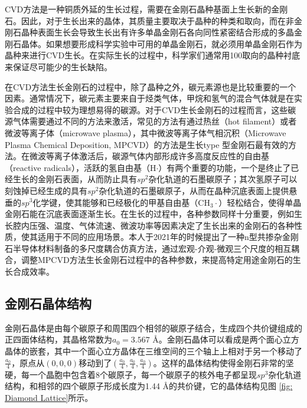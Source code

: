 \documentclass[type = bachelor]{whu-thesis}
\begin{document}
CVD方法是一种铜质外延的生长过程，需要在金刚石晶种基面上生长新的金刚石\cite{isberg2002high,isberg2002high}。因此，对于生长出来的晶体，其质量主要取决于晶种的种类和取向，而在非金刚石晶种表面生长会导致生长出有许多单晶金刚石各向同性紧密结合形成的多晶金刚石晶体\cite{mildren2013optical, jahnke2012long}。如果想要形成科学实验中可用的单晶金刚石，就必须用单晶金刚石作为晶种来进行CVD生长。在实际生长的过程中，科学家们通常用{100}取向的晶种衬底来保证尽可能少的生长缺陷\cite{gicquel2001cvd}。

在CVD方法生长金刚石的过程中，除了晶种之外，碳元素源也是比较重要的一个因素。通常情况下，碳元素主要来自于烃类气体，甲烷和氢气的混合气体就是在实验合成的过程中较为理想易得的碳源。对于CVD生长金刚石的过程而言，这些碳源气体需要通过不同的方法来激活，常见的方法有通过热丝（hot filament）或者微波等离子体（microwave plasma），其中微波等离子体气相沉积（Microwave Plasma Chemical Deposition, MPCVD）的方法是生长type \uppercase\expandafter{}型金刚石最有效的方法\cite{robins1990line, nemanich2014cvd}。在微波等离子体激活后，碳源气体内部形成许多高度反应性的自由基（reactive radicals），活跃的氢自由基（H$\cdot$）有两个重要的功能，一个是终止了已经生长的金刚石表面，从而防止具有$sp^2$杂化轨道的石墨碳原子；其次氢原子可以刻蚀掉已经生成的具有$sp^2$杂化轨道的石墨碳原子，从而在晶种沉底表面上提供悬垂的$sp^3$化学键，使其能够和已经极化的甲基自由基（CH$_3\cdot$）轻松结合，使得单晶金刚石能在沉底表面逐渐生长\cite{denisenko2010surface}。在生长的过程中，各种参数同样十分重要，例如生长腔内压强、温度、气体流速、微波功率等因素决定了生长出来的金刚石的各种性质，使其适用于不同的应用场景。本人于2021年的时候提出了一种n型共掺杂金刚石半导体材料制备的多尺度耦合仿真方法，通过宏观-介观-微观三个尺度的相互耦合，调整MPCVD方法生长金刚石过程中的各种参数，来提高特定用途金刚石的生长合成效率\cite{CN113096749B}。

\subsection{金刚石晶体结构}
金刚石晶体是由每个碳原子和周围四个相邻的碳原子结合，生成四个共价键组成的正四面体结构，其晶格常数为$a_0 = 3.567$ \unit{\angstrom}。金刚石晶体可以看成是两个面心立方晶体的嵌套，其中一个面心立方晶体在三维空间的三个轴上上相对于另一个移动了$\frac{a_0}{4}$，原点从$(0, 0, 0)$移动到了$(\frac{a_0}{4}, \frac{a_0}{4}, \frac{a_0}{4})$。这样的晶体结构使得金刚石非常的坚硬，每一个晶胞中包含着8个碳原子，每一个碳原子的核外电子都呈现$sp^3$杂化轨道结构，和相邻的四个碳原子形成长度为1.44 \unit{\angstrom}的共价键，它的晶体结构见图 \ref{fig: Diamond Lattice}所示。
\end{document}
